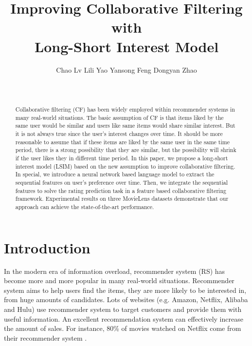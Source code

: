 \documentclass{sig-alternate-05-2015}
\begin{document}

\title{Improving Collaborative Filtering with\\
Long-Short Interest Model}

\author{
\alignauthor
Chao Lv \quad
Lili Yao \quad
Yansong Feng \quad
Dongyan Zhao\\
\\
\\
}

\maketitle

\begin{abstract}
Collaborative filtering (CF) has been widely employed within
recommender systems in many real-world situations.
The basic assumption of CF is that items liked by the same user would be similar and
users like same items would share similar interest.
But it is not always true since the user's interest changes over time.
It should be more reasonable to assume that
if these items are liked by the same user in the same time period,
there is a strong possibility that they are similar,
but the possibility will shrink if the user likes they in different time period.
In this paper, we propose a long-short interest model (LSIM) based on
the new assumption to improve collaborative filtering.
In special, we introduce a neural network based language model
to extract the sequential features on user's preference over time.
Then, we integrate the sequential features to solve the rating prediction task
in a feature based collaborative filtering framework.
Experimental results on three MovieLens datasets demonstrate that
our approach can achieve the state-of-the-art performance.
\end{abstract}


\section{Introduction}
In the modern era of information overload,
recommender system (RS) has become more and more popular in many real-world situations.
Recommender system aims to help users find the items,
they are more likely to be interested in,
from huge amounts of candidates.
Lots of websites (e.g. Amazon, Netflix, Alibaba and Hulu) use recommender system to
target customers and provide them with useful information.
An excellent recommendation system can effectively increase the amount of sales.
For instance, 80\% of movies watched on Netflix
come from their recommender system \cite{gomez2015netflix}.
\end{document}
